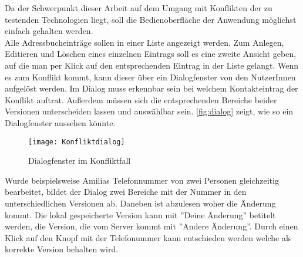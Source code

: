 Da der Schwerpunkt dieser Arbeit auf dem Umgang mit Konflikten der zu testenden Technologien liegt, soll die Bedienoberfläche der Anwendung möglichst einfach gehalten werden.\\
Alle Adressbucheinträge sollen in einer Liste angezeigt werden. Zum Anlegen, Editieren und Löschen eines einzelnen Eintrags soll es eine zweite Ansicht geben, auf die man per Klick auf den entsprechenden Eintrag in der Liste gelangt.
Wenn es zum Konflikt kommt, kann dieser über ein Dialogfenster von den NutzerInnen aufgelöst werden.
Im Dialog muss erkennbar sein bei welchem Kontakteintrag der Konflikt auftrat.
Außerdem müssen sich die entsprechenden Bereiche beider Versionen unterscheiden lassen und auswählbar sein. \autoref{fig:dialog} zeigt, wie so ein Dialogfenster aussehen könnte.
%
\begin{figure}[H]
	\centering
	\texttt{[image: Konfliktdialog]}
	\grayRule
	\caption{Dialogfenster im Konfliktfall}
	\label{fig:dialog}
\end{figure}
%
Wurde beispielsweise Amilias Telefonnummer von zwei Personen gleichzeitig bearbeitet, bildet der Dialog zwei Bereiche mit der Nummer in den unterschiedlichen Versionen ab.
Daneben ist abzulesen woher die Änderung kommt.
Die lokal gespeicherte Version kann mit ''Deine Änderung'' betitelt werden, die Version, die vom Server kommt mit ''Andere Änderung''.
Durch einen Klick auf den Knopf mit der Telefonummer kann entschieden werden welche als korrekte Version behalten wird.